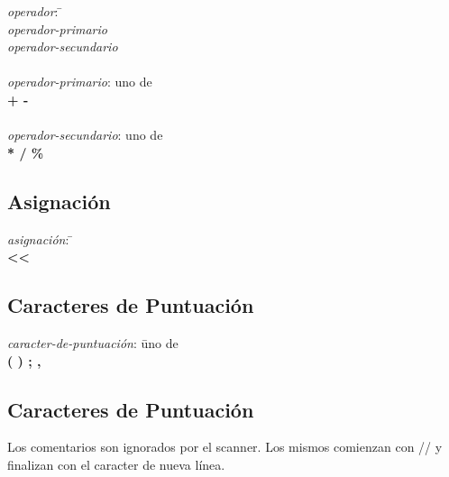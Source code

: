 \begin{tabbing}

\textit{operador}: \= \+ \\
    \textit{operador-primario} \\
    \textit{operador-secundario} \\

\- \\ \textit{operador-primario}: uno de \+ \\
    \textbf{
        +
        \hspace{3pt}
        -
    }\\

\- \\ \textit{operador-secundario}: uno de \+ \\
    \textbf{
        *
        \hspace{3pt}
        /
        \hspace{3pt}
        \%
    }

\end{tabbing}

\subsection{Asignación}

\begin{tabbing}

\textit{asignación}: \= \+ \\
    \textbf{<}\textbf{<}

\end{tabbing}

\subsection{Caracteres de Puntuación}

\begin{tabbing}

\textit{caracter-de-puntuación}: \= uno de \+ \\
    \textbf{
        (
        \hspace{3pt}
        )
        \hspace{3pt}
        ;
        \hspace{3pt}
        ,
    }

\end{tabbing}

\subsection{Caracteres de Puntuación}

Los comentarios son ignorados por el scanner. Los mismos comienzan con // y finalizan con el caracter de nueva línea.
